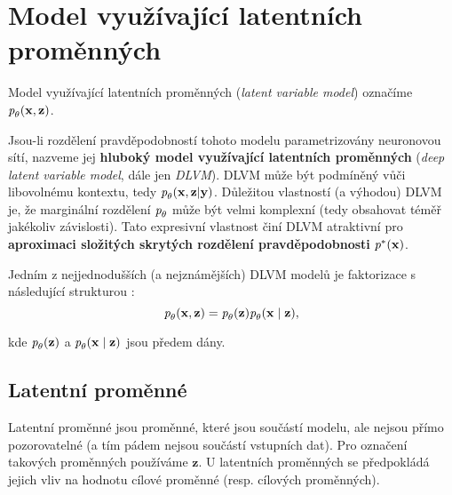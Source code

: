 \section{Model využívající latentních proměnných}
\label{sec:latent_variable_models}
Model využívající latentních proměnných (\emph{latent variable model}) označíme $\emph{p}_\theta(\mathbf{x}, \mathbf{z})$.

Jsou-li rozdělení pravděpodobností tohoto modelu parametrizovány neuronovou sítí,
nazveme jej \textbf{hluboký model využívající latentních proměnných} (\emph{deep latent variable model}, dále jen \emph{DLVM}). DLVM může být podmíněný vůči libovolnému kontextu, tedy $\emph{p}_{\theta}(\mathbf{x}, \mathbf{z}|\mathbf{y})$.
Důležitou vlastností (a výhodou) DLVM je, že marginální rozdělení $\emph{p}_\theta$ může být velmi komplexní (tedy obsahovat téměř jakékoliv závislosti).
Tato expresivní vlastnost činí DLVM atraktivní pro \textbf{aproximaci složitých skrytých rozdělení pravděpodobnosti} $\emph{p}^*(\mathbf{x})$. \cite{Kingma2019}

Jedním z nejjednodušších (a nejznámějších) DLVM modelů je faktorizace s následující strukturou \cite{Kingma2019}:
\begin{equation}
    \emph{p}_\theta(\mathbf{x}, \mathbf{z}) = \emph{p}_\theta(\mathbf{z})\emph{p}_\theta(\mathbf{x}\mid\mathbf{z}),
\end{equation}

kde $\emph{p}_\theta(\mathbf{z})$ a $\emph{p}_\theta(\mathbf{x}\mid\mathbf{z})$ jsou předem dány.
\subsection{Latentní proměnné}
Latentní proměnné jsou proměnné, které jsou součástí modelu, ale nejsou přímo pozorovatelné (a tím pádem nejsou součástí vstupních dat).
Pro označení takových proměnných používáme $\mathbf{z}$. U latentních proměnných se předpokládá jejich vliv na hodnotu cílové proměnné (resp. cílových proměnných). \cite{Kingma2019}
